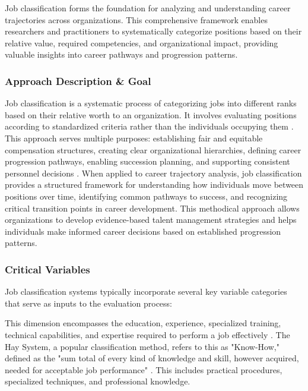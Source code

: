 \documentclass[../main.tex]{subfiles}
\begin{document}
Job classification forms the foundation for analyzing and understanding career trajectories across organizations. This comprehensive framework enables researchers and practitioners to systematically categorize positions based on their relative value, required competencies, and organizational impact, providing valuable insights into career pathways and progression patterns.

\subsubsection{Approach Description \& Goal}

Job classification is a systematic process of categorizing jobs into different ranks based on their relative worth to an organization. It involves evaluating positions according to standardized criteria rather than the individuals occupying them \parencite{aihr2024}. This approach serves multiple purposes: establishing fair and equitable compensation structures, creating clear organizational hierarchies, defining career progression pathways, enabling succession planning, and supporting consistent personnel decisions \parencite{aihr2024,bamboohr2024}. When applied to career trajectory analysis, job classification provides a structured framework for understanding how individuals move between positions over time, identifying common pathways to success, and recognizing critical transition points in career development. This methodical approach allows organizations to develop evidence-based talent management strategies and helps individuals make informed career decisions based on established progression patterns.

\subsubsection{Critical Variables}

Job classification systems typically incorporate several key variable categories that serve as inputs to the evaluation process:

This dimension encompasses the education, experience, specialized training, technical capabilities, and expertise required to perform a job effectively \parencite{peoplebox2024,synergogy2024}. The Hay System, a popular classification method, refers to this as "Know-How," defined as the "sum total of every kind of knowledge and skill, however acquired, needed for acceptable job performance" \parencite{waterloo2024}. This includes practical procedures, specialized techniques, and professional knowledge.
\end{document}
